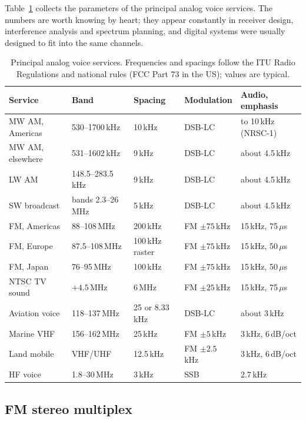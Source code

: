 Table~\ref{tab:ch04:bcast} collects the parameters of the principal analog voice services. The numbers are
worth knowing by heart; they appear constantly in receiver design, interference analysis and spectrum
planning, and digital systems were usually designed to fit into the same channels.

\begin{table}[htbp]\centering\small
\caption{Principal analog voice services. Frequencies and spacings follow the ITU Radio Regulations and
national rules (FCC Part 73 in the US); values are typical.}
\label{tab:ch04:bcast}
\begin{tabular}{@{}lllll@{}}
\toprule
Service & Band & Spacing & Modulation & Audio, emphasis \\
\midrule
MW AM, Americas & 530--1700\,kHz & 10\,kHz & DSB-LC & to 10\,kHz (NRSC-1) \\
MW AM, elsewhere & 531--1602\,kHz & 9\,kHz & DSB-LC & about 4.5\,kHz \\
LW AM & 148.5--283.5\,kHz & 9\,kHz & DSB-LC & about 4.5\,kHz \\
SW broadcast & bands 2.3--26\,MHz & 5\,kHz & DSB-LC & about 4.5\,kHz \\
FM, Americas & 88--108\,MHz & 200\,kHz & FM $\pm75$\,kHz & 15\,kHz, 75\,$\mu$s \\
FM, Europe & 87.5--108\,MHz & 100\,kHz raster & FM $\pm75$\,kHz & 15\,kHz, 50\,$\mu$s \\
FM, Japan & 76--95\,MHz & 100\,kHz & FM $\pm75$\,kHz & 15\,kHz, 50\,$\mu$s \\
NTSC TV sound & $+4.5$\,MHz & 6\,MHz & FM $\pm25$\,kHz & 15\,kHz, 75\,$\mu$s \\
Aviation voice & 118--137\,MHz & 25 or 8.33\,kHz & DSB-LC & about 3\,kHz \\
Marine VHF & 156--162\,MHz & 25\,kHz & FM $\pm5$\,kHz & 3\,kHz, 6\,dB/oct \\
Land mobile & VHF/UHF & 12.5\,kHz & FM $\pm2.5$\,kHz & 3\,kHz, 6\,dB/oct \\
HF voice & 1.8--30\,MHz & 3\,kHz & SSB & 2.7\,kHz \\
\bottomrule
\end{tabular}
\end{table}

\subsection{FM stereo multiplex}
\label{sec:ch04:stereo}

